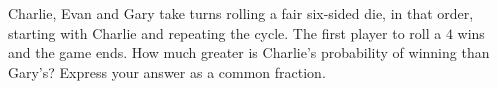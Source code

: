 Charlie, Evan and Gary take turns rolling a fair six-sided die, in that order, starting with Charlie and repeating the cycle. The first player to roll a $4$ wins and the game ends. How much greater is Charlie's probability of winning than Gary's? Express your answer as a common fraction.
